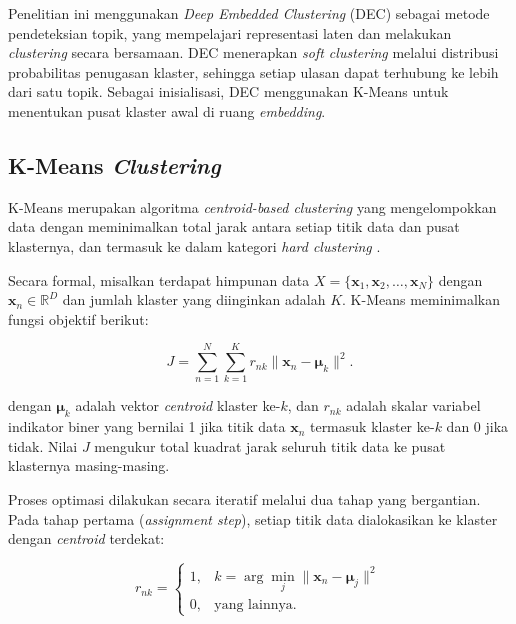 Penelitian ini menggunakan \textit{Deep Embedded Clustering} (DEC)
\parencite{xie2016unsupervised} sebagai metode pendeteksian topik, yang
mempelajari representasi laten dan melakukan \textit{clustering} secara
bersamaan. DEC menerapkan \textit{soft clustering} melalui distribusi
probabilitas penugasan klaster, sehingga setiap ulasan dapat terhubung ke
lebih dari satu topik. Sebagai inisialisasi, DEC menggunakan K-Means untuk
menentukan pusat klaster awal di ruang \textit{embedding}.

\subsection{K-Means \textit{Clustering}}

K-Means merupakan algoritma \textit{centroid-based clustering} yang
mengelompokkan data dengan meminimalkan total jarak antara setiap titik
data dan pusat klasternya, dan termasuk ke dalam kategori \textit{hard
clustering} \parencite{macqueen1967some}.

Secara formal, misalkan terdapat himpunan data $X = \{\mathbf{x}_1,
\mathbf{x}_2, \ldots, \mathbf{x}_N\}$ dengan $\mathbf{x}_n \in
\mathbb{R}^D$ dan jumlah klaster yang diinginkan adalah $K$. K-Means
meminimalkan fungsi objektif berikut:

\begin{equation}
    J = \sum_{n=1}^{N} \sum_{k=1}^{K} r_{nk}
    \|\mathbf{x}_n - \boldsymbol{\mu}_k\|^2.
    \label{eq:kmeans_objective}
\end{equation}

\noindent dengan $\boldsymbol{\mu}_k$ adalah vektor \textit{centroid} klaster
ke-$k$, dan $r_{nk}$ adalah skalar variabel indikator biner yang bernilai
1 jika titik data $\mathbf{x}_n$ termasuk klaster ke-$k$ dan 0 jika
tidak. Nilai $J$ mengukur total kuadrat jarak seluruh titik data ke pusat
klasternya masing-masing.

Proses optimasi dilakukan secara iteratif melalui dua tahap yang
bergantian. Pada tahap pertama (\textit{assignment step}), setiap titik
data dialokasikan ke klaster dengan \textit{centroid} terdekat:

\begin{equation}
    r_{nk} = \begin{cases}
        1, & k = \arg\min_j \|\mathbf{x}_n - \boldsymbol{\mu}_j\|^2 \\
        0, & \text{yang lainnya.}
    \end{cases}
    \label{eq:assignment_step}
\end{equation}

